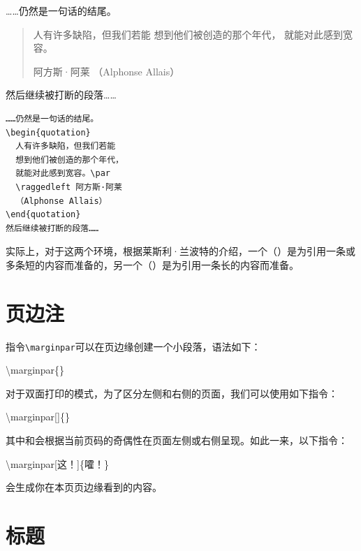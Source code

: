 \begin{codelist}[2.16]{
  ……仍然是一句话的结尾。
\begin{quotation}
  人有许多缺陷，但我们若能
  想到他们被创造的那个年代，
  就能对此感到宽容。\par
  \raggedleft 阿方斯·阿莱
  （Alphonse Allais）
\end{quotation}
然后继续被打断的段落……
}\begin{verbatim}
……仍然是一句话的结尾。
\begin{quotation}
  人有许多缺陷，但我们若能
  想到他们被创造的那个年代，
  就能对此感到宽容。\par
  \raggedleft 阿方斯·阿莱
  （Alphonse Allais）
\end{quotation}
然后继续被打断的段落……
\end{verbatim}
\end{codelist}

实际上，对于这两个环境，根据莱斯利·兰波特的介绍，一个（）是为引用一条或多条短的内容而准备的，另一个（）是为引用一条长的内容而准备。

\section{页边注}

指令\verb|\marginpar|可以在页边缘创建一个小段落，语法如下：

\begin{dmd}
\backslash marginpar\{\}
\end{dmd}

对于双面打印的模式，为了区分左侧和右侧的页面，我们可以使用如下指令：

\begin{dmd}
\backslash marginpar[]\{\}
\end{dmd}

其中和会根据当前页码的奇偶性在页面左侧或右侧呈现。如此一来，以下指令：

\begin{dmd}
\backslash marginpar[这！]\{嚯！\}
\end{dmd}

会生成你在本页页边缘看到的内容。

\section{标题}

